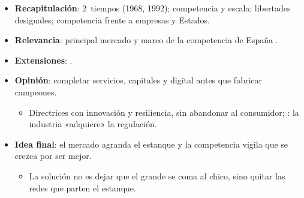 \documentclass{article}
\begin{document}
\begin{columnas}
\begin{itemize}
\item \textbf{Recapitulación}: 2~tiempos (1968, 1992); competencia y escala; libertades desiguales; competencia frente a empresas y Estados.
\item \textbf{Relevancia}: principal mercado y marco de la competencia de España .
\item \textbf{Extensiones}:     .
\item \textbf{Opinión}: completar servicios, capitales y digital antes que fabricar campeones.
  \begin{itemize}
  \item Directrices con innovación y resiliencia, sin abandonar al consumidor; : la industria «adquiere» la regulación.
  \end{itemize}
\item \textbf{Idea final}: el mercado agranda el estanque y la competencia vigila que se crezca por ser mejor.
  \begin{itemize}
  \item La solución no es dejar que el grande se coma al chico, sino quitar las redes que parten el estanque.
  \end{itemize}
\end{itemize}


\end{columnas}
\end{document}
